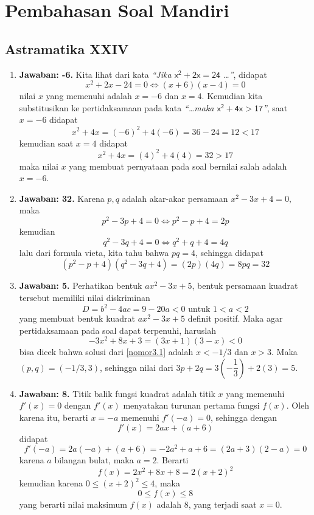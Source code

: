 \chapter{Pembahasan Soal Mandiri}
\section{Astramatika XXIV}

\begin{enumerate}

\item \textbf{Jawaban: -6.} Kita lihat dari kata \emph{\sffamily ``Jika ${\mathsf{x}^\mathsf{2}+\mathsf{2}\mathsf{x}=\mathsf{2}\mathsf{4}}$ \ldots''}, didapat \[x^2+2x-24 = 0\Leftrightarrow (x+6)(x-4) = 0\]nilai $x$ yang memenuhi adalah $x=-6$ dan $x=4$. Kemudian kita substitusikan ke pertidaksamaan pada kata \emph{\sffamily``\ldots maka ${\mathsf{x}^\mathsf{2}+\mathsf{4}\mathsf{x}>\mathsf{1}\mathsf{7}}$''}, saat $x = -6$ didapat \[x^2 + 4x = (-6)^2 + 4(-6) = 36 - 24 = 12 < 17\]kemudian saat $x=4$ didapat \[x^2+4x = (4)^2 + 4(4) = 32 > 17\]maka nilai $x$ yang membuat pernyataan pada soal bernilai salah adalah $x=-6$.

\item \textbf{Jawaban: 32.} Karena $p,q$ adalah akar-akar persamaan $x^2-3x+4=0,$ maka \[p^2-3p+4 =0\Leftrightarrow p^2-p+4 = 2p\]kemudian\[q^2-3q+4 = 0\Leftrightarrow q^2+q+4=4q\]lalu dari formula vieta, kita tahu bahwa $pq = 4$, sehingga didapat \[(p^2-p+4)(q^2-3q+4) = (2p)(4q) = 8pq = 32\]

\item \textbf{Jawaban: 5.} Perhatikan bentuk $ax^2-3x+5$, bentuk persamaan kuadrat tersebut memiliki nilai diskriminan \[D = b^2-4ac = 9-20a < 0\text{ untuk $1<a<2$}\]yang membuat bentuk kuadrat $ax^2-3x+5$ definit positif. Maka agar pertidaksamaan pada soal dapat terpenuhi, haruslah \begin{equation}\label{nomor3.1}-3x^2+8x+3 = (3x+1)(3-x) < 0\end{equation}bisa dicek bahwa solusi dari \eqref{nomor3.1} adalah $x<-1/3$ dan $x>3$. Maka $(p,q) = (-1/3, 3)$, sehingga nilai dari $3p +2q = 3\left(-\dfrac{1}{3}\right) + 2(3) = 5.$

\item \textbf{Jawaban: 8.} Titik balik fungsi kuadrat adalah titik $x$ yang memenuhi $f'(x) = 0$ dengan $f'(x)$ menyatakan turunan pertama fungsi $f(x)$. Oleh karena itu, berarti $x=-a$ memenuhi $f'(-a) = 0$, sehingga dengan \[f'(x) = 2ax + (a+6)\]didapat\[f'(-a) = 2a(-a)+(a+6) = -2a^2+a+6 = (2a+3)(2-a) = 0\]karena $a$ bilangan bulat, maka $a=2$. Berarti \[f(x) = 2x^2+8x+8 = 2(x+2)^2\]kemudian karena $0\leq (x+2)^2 \leq 4$, maka \[0\leq f(x)\leq 8\] yang berarti nilai maksimum $f(x)$ adalah 8, yang terjadi saat $x=0$.


\end{enumerate}
